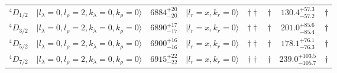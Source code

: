 \begin{tabular}{c| c c c c c c c}
$^{4}D_{1/2}$ & $\vert l_{\lambda}\!\!=\!0, l_{\rho}\!\!=\!2, k_{\lambda}\!\!=\!0, k_{\rho}\!\!=\!0 \rangle$ & $6884^{+20}_{-20}$ & $\vert l_r\!\!=\!x, k_r\!\!=\!0 \rangle$ & $\dagger\dagger$ & $\dagger$ & $130.4^{+57.3}_{-57.2}$ & $\dagger$ \\ 
$^{4}D_{3/2}$ & $\vert l_{\lambda}\!\!=\!0, l_{\rho}\!\!=\!2, k_{\lambda}\!\!=\!0, k_{\rho}\!\!=\!0 \rangle$ & $6890^{+17}_{-17}$ & $\vert l_r\!\!=\!x, k_r\!\!=\!0 \rangle$ & $\dagger\dagger$ & $\dagger$ & $201.0^{+85.6}_{-85.4}$ & $\dagger$ \\ 
$^{4}D_{5/2}$ & $\vert l_{\lambda}\!\!=\!0, l_{\rho}\!\!=\!2, k_{\lambda}\!\!=\!0, k_{\rho}\!\!=\!0 \rangle$ & $6900^{+16}_{-16}$ & $\vert l_r\!\!=\!x, k_r\!\!=\!0 \rangle$ & $\dagger\dagger$ & $\dagger$ & $178.1^{+76.1}_{-76.3}$ & $\dagger$ \\ 
$^{4}D_{7/2}$ & $\vert l_{\lambda}\!\!=\!0, l_{\rho}\!\!=\!2, k_{\lambda}\!\!=\!0, k_{\rho}\!\!=\!0 \rangle$ & $6915^{+22}_{-22}$ & $\vert l_r\!\!=\!x, k_r\!\!=\!0 \rangle$ & $\dagger\dagger$ & $\dagger$ & $239.0^{+103.5}_{-105.7}$ & $\dagger$ \\ 
\hline \hline
\end{tabular}
